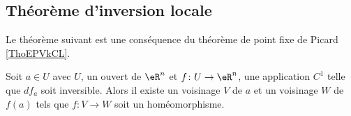 \subsection{Théorème d'inversion locale}

Le théorème suivant est une conséquence du théorème de point fixe de Picard \ref{ThoEPVkCL}.
\begin{theorem}
    Soit \( a\in U\) avec \( U\), un ouvert de \( \eR^n\) et \( f\colon U\to \eR^n\), une application \( C^1\) telle que \( df_a\) soit inversible. Alors il existe un voisinage \( V\) de \( a\) et un voisinage \( W\) de \( f(a)\) tels que \( f\colon V\to W\) soit un homéomorphisme.
\end{theorem}


